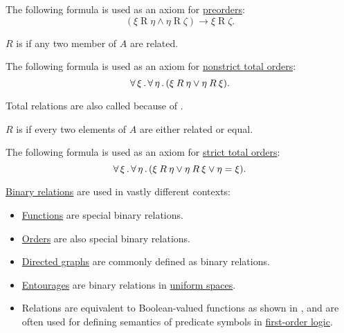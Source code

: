 \begin{definition}
\begin{thmenum}[resume=def:binary_relation]
    The following formula is used as an axiom for \hyperref[def:partially_ordered_set]{preorders}:
    \begin{equation}\label{eq:def:binary_relation/transitive}
      (\xi \mathbin{R} \eta \wedge \eta \mathbin{R} \zeta) \rightarrow \xi \mathbin{R} \zeta.
    \end{equation}

     \( R \) is  if any two member of \( A \) are related.

    The following formula is used as an axiom for \hyperref[def:totally_ordered_set]{nonstrict total orders}:
    \begin{equation}\label{eq:def:binary_relation/total}
      \forall \thinspace \xi \thinspace . \thinspace \forall \thinspace \eta \thinspace . \thinspace (\xi \mathbin{R} \eta \vee \eta \mathbin{R} \xi).
    \end{equation}

    Total relations are also called  because of .

     \( R \) is  if every two elements of \( A \) are either related or equal.

    The following formula is used as an axiom for \hyperref[def:totally_ordered_set]{strict total orders}:
    \begin{equation}\label{eq:def:binary_relation/trichotomic}
      \forall \thinspace \xi \thinspace . \thinspace \forall \thinspace \eta \thinspace . \thinspace (\xi \mathbin{R} \eta \vee \eta \mathbin{R} \xi \vee \eta = \xi).
    \end{equation}
  \end{thmenum}
\end{definition}

\begin{example}\label{ex:def:binary_relation}
  \hyperref[def:binary_relation]{Binary relations} are used in vastly different contexts:
  \begin{itemize}
    \item \hyperref[def:function]{Functions} are special binary relations.
    \item \hyperref[sec:order_theory]{Orders} are also special binary relations.
    \item \hyperref[def:quiver/simple]{Directed graphs} are commonly defined as binary relations.
    \item \hyperref[def:entourage]{Entourages} are binary relations in \hyperref[def:uniform_space]{uniform spaces}.
    \item Relations are equivalent to Boolean-valued functions as shown in , and are often used for defining semantics of predicate symbols in \hyperref[subsec:first_order_logic]{first-order logic}.
  \end{itemize}
\end{example}

